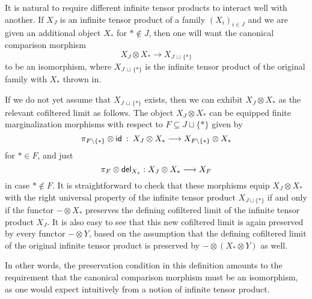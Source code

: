 \documentclass[11pt]{article}
\begin{document}
\begin{remark}
	\label{preserve}
	It is natural to require different infinite tensor products to interact well with another. If $X_J$ is an infinite tensor product of a family $(X_i)_{i \in J}$ and we are given an additional object $X_\ast$ for $\ast \not \in J$, then one will want the canonical comparison morphism
	\begin{equation}
		\label{comparison}
		X_J \otimes X_\ast \longrightarrow X_{J \,\sqcup\, \{\ast\}}
	\end{equation}
	to be an isomorphism, where $X_{J \,\sqcup\, \{\ast\}}$ is the infinite tensor product of the original family with $X_\ast$ thrown in.
	
	If we do not yet assume that $X_{J \,\sqcup\, \{\ast\}}$ exists, then we can exhibit $X_J \otimes X_\ast$ as the relevant cofiltered limit as follows. The object $X_J \otimes X_\ast$ can be equipped finite marginalization morphisms with respect to $F \subseteq J \sqcup \{\ast\}$ given by
	\[
		\pi_{F \setminus \{\ast\}} \otimes \mathsf{id} \: : \: X_J \otimes X_\ast \longrightarrow X_{F \setminus \{\ast\}} \otimes X_\ast
	\]
	for $\ast \in F$, and just
	\[
		\pi_F \otimes \mathsf{del}_{X_\ast} : X_J \otimes X_\ast \longrightarrow X_F 
	\]
	in case $\ast \not \in F$. It is straightforward to check that these morphisms equip $X_J \otimes X_\ast$ with the right universal property of the infinite tensor product $X_{J \sqcup \{\ast\}}$ if and only if the functor $- \otimes X_\ast$ preserves the defining cofiltered limit of the infinite tensor product $X_J$. It is also easy to see that this new cofiltered limit is again preserved by every functor $- \otimes Y$, based on the assumption that the defining cofiltered limit of the original infinite tensor product is preserved by $- \otimes (X_\ast \otimes Y)$ as well.

	In other words, the preservation condition in this definition amounts to the requirement that the canonical comparison morphism
	must be an isomorphism, as one would expect intuitively from a notion of infinite tensor product. 
\end{remark}
\end{document}
